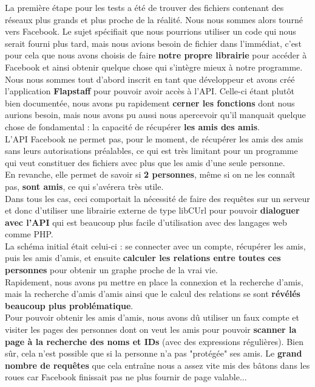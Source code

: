 \documentclass[a4paper, titlepage, oneside]{book}
\begin{document}
La première étape pour les tests a été de trouver des fichiers contenant des réseaux plus grands et plus proche de la réalité. Nous nous sommes alors tourné vers Facebook. Le sujet spécifiait que nous pourrions utiliser un code qui nous serait fourni plus tard, mais nous avions besoin de fichier dans l'immédiat, c'est pour cela que nous avons choisis de faire \textbf{notre propre librairie} pour accéder à Facebook et ainsi obtenir quelque chose qui s'intègre mieux à notre programme.\\

Nous nous sommes tout d'abord inscrit en tant que développeur et avons créé l'application \textbf{Flapstaff} pour pouvoir avoir accès à l'API. Celle-ci étant plutôt bien documentée, nous avons pu rapidement \textbf{cerner les fonctions} dont nous aurions besoin, mais nous avons pu aussi nous apercevoir qu'il manquait quelque chose de fondamental : la capacité de récupérer \textbf{les amis des amis}.\\
L'API Facebook ne permet pas, pour le moment, de récupérer les amis des amis sans leurs autorisations préalables, ce qui est très limitant pour un programme qui veut constituer des fichiers avec plus que les amis d'une seule personne.\\
En revanche, elle permet de savoir si \textbf{2 personnes}, même si on ne les connaît pas, \textbf{sont amis}, ce qui s'avérera très utile.\\

Dans tous les cas, ceci comportait la nécessité de faire des requêtes sur un serveur et donc d'utiliser une librairie externe de type libCUrl pour pouvoir \textbf{dialoguer avec l'API} qui est beaucoup plus facile d'utilisation avec des langages web comme PHP.\\
La schéma initial était celui-ci : se connecter avec un compte, récupérer les amis, puis les amis d'amis, et ensuite \textbf{calculer les relations entre toutes ces personnes} pour obtenir un graphe proche de la vrai vie.\\

Rapidement, nous avons pu mettre en place la connexion et la recherche d'amis, mais la recherche d'amis d'amis ainsi que le calcul des relations se sont \textbf{révélés beaucoup plus problématique}.\\

Pour pouvoir obtenir les amis d'amis, nous avons dû utiliser un faux compte et visiter les pages des personnes dont on veut les amis pour pouvoir \textbf{scanner la page à la recherche des noms et IDs} (avec des expressions régulières). Bien sûr, cela n'est possible que si la personne n'a pas "protégée" ses amis. Le \textbf{grand nombre de requêtes} que cela entraîne nous a assez vite mis des bâtons dans les roues car Facebook finissait pas ne plus fournir de page valable...\\
\end{document}
